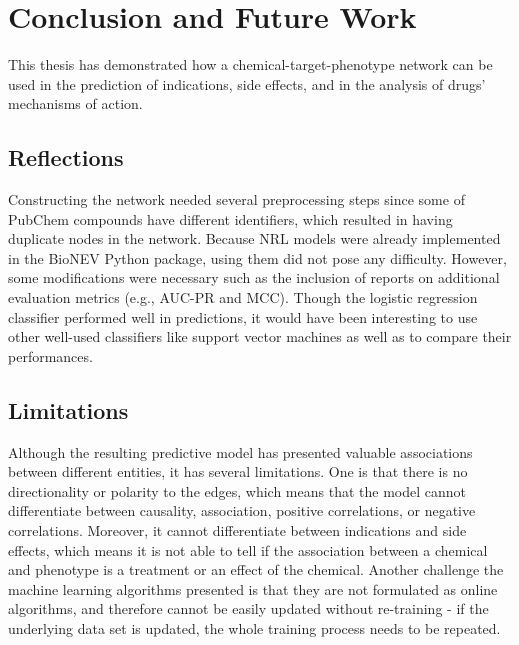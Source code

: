 \chapter{Conclusion and Future Work}
\label{conclusion}
This thesis has demonstrated how a chemical-target-phenotype network can be used in the prediction of indications, side effects, and in the analysis of drugs' mechanisms of action. 
\section{Reflections}
Constructing the network needed several preprocessing steps since some of PubChem compounds have different identifiers, which resulted in having duplicate nodes in the network. Because \ac{NRL} models were already implemented in the BioNEV Python package, using them did not pose any difficulty.
However, some modifications were necessary such as the inclusion of reports on additional evaluation metrics (e.g., AUC-PR and \ac{MCC}).
Though the logistic regression classifier performed well in predictions, it would have been interesting to use other well-used classifiers like support vector machines as well as to compare their performances.

\section{Limitations}
Although the resulting predictive model has presented valuable associations between different entities, it has several limitations.
One is that there is no directionality or polarity to the edges, which means that the model cannot differentiate between causality, association, positive correlations, or negative correlations.
Moreover, it cannot differentiate between indications and side effects, which means it is not able to tell if the association between a chemical and phenotype is a treatment or an effect of the chemical.
Another challenge the machine learning algorithms presented is that they are not formulated as online algorithms, and therefore cannot be easily updated without re-training - if the underlying data set is updated, the whole training process needs to be repeated.

